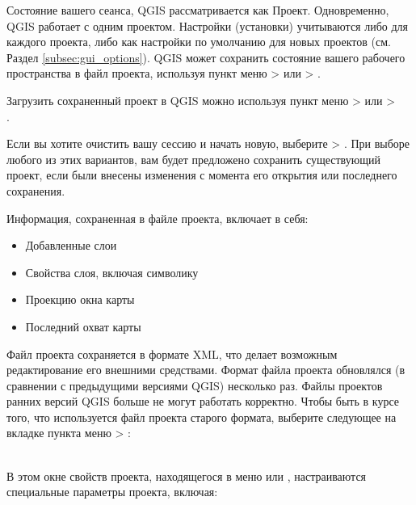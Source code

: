 Состояние вашего сеанса, QGIS рассматривается как Проект. Одновременно, QGIS работает с одним проектом.
Настройки (установки) учитываются либо для каждого проекта, либо как настройки по умолчанию для новых проектов (см. Раздел \ref{subsec:gui_options}). QGIS может сохранить состояние вашего рабочего пространства в файл проекта, используя пункт меню  >  или  > .

Загрузить сохраненный проект в QGIS можно используя пункт меню  >  или  > \\
.

Если вы хотите очистить вашу сессию и начать новую, выберите  > . При выборе любого из этих вариантов, вам будет предложено сохранить существующий проект, если были внесены изменения с момента его открытия или последнего сохранения.

Информация, сохраненная в файле проекта, включает в себя:

\begin{itemize}
\item Добавленные слои
\item Свойства слоя, включая символику
\item Проекцию окна карты
\item Последний охват карты
\end{itemize}

Файл проекта сохраняется в формате XML, что делает возможным редактирование его внешними средствами. Формат файла проекта обновлялся (в сравнении с предыдущими версиями QGIS) несколько раз. Файлы проектов ранних версий QGIS больше не могут работать корректно. Чтобы быть в курсе того, что используется файл проекта старого формата, выберите следующее на вкладке  пункта меню  > : \\

 \\

В этом окне свойств проекта, находящегося в меню  или , настраиваются специальные параметры проекта, включая:

